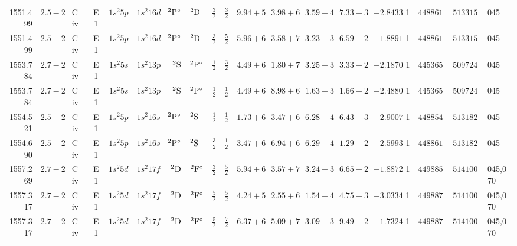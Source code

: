 \begin{table*}
\begin{tabular}{rrlcr@{ -- }lr@{ -- }lr@{ -- }lllllrrr@{ -- }rl}
   1551.499\phantom{0000000} & $2.5-2$ & C\,{\sc iv} & E1 &  $1s^{2}5p$ & $1s^{2}16d$ & $^{2}{\rm P}^\circ$ & $^{2}{\rm D}$       &  $\frac{3}{2}$ & $\frac{3}{2}$  & $9.94+5$ & $3.98+6$ & $3.59-4$ & $7.33-3$ & $ -2.8433$ &     1 & $448861.20$ & $513315.00$ & 045 \\
   1551.499\phantom{0000000} & $2.5-2$ & C\,{\sc iv} & E1 &  $1s^{2}5p$ & $1s^{2}16d$ & $^{2}{\rm P}^\circ$ & $^{2}{\rm D}$       &  $\frac{3}{2}$ & $\frac{5}{2}$  & $5.96+6$ & $3.58+7$ & $3.23-3$ & $6.59-2$ & $ -1.8891$ &     1 & $448861.20$ & $513315.00$ & 045 \\
   1553.784\phantom{0000000} & $2.7-2$ & C\,{\sc iv} & E1 &  $1s^{2}5s$ & $1s^{2}13p$ &       $^{2}{\rm S}$ & $^{2}{\rm P}^\circ$ &  $\frac{1}{2}$ & $\frac{3}{2}$  & $4.49+6$ & $1.80+7$ & $3.25-3$ & $3.33-2$ & $ -2.1870$ &     1 & $445365.70$ & $509724.70$ & 045 \\
   1553.784\phantom{0000000} & $2.7-2$ & C\,{\sc iv} & E1 &  $1s^{2}5s$ & $1s^{2}13p$ &       $^{2}{\rm S}$ & $^{2}{\rm P}^\circ$ &  $\frac{1}{2}$ & $\frac{1}{2}$  & $4.49+6$ & $8.98+6$ & $1.63-3$ & $1.66-2$ & $ -2.4880$ &     1 & $445365.70$ & $509724.70$ & 045 \\
   1554.521\phantom{0000000} & $2.5-2$ & C\,{\sc iv} & E1 &  $1s^{2}5p$ & $1s^{2}16s$ & $^{2}{\rm P}^\circ$ & $^{2}{\rm S}$       &  $\frac{1}{2}$ & $\frac{1}{2}$  & $1.73+6$ & $3.47+6$ & $6.28-4$ & $6.43-3$ & $ -2.9007$ &     1 & $448854.20$ & $513182.70$ & 045 \\
   1554.690\phantom{0000000} & $2.5-2$ & C\,{\sc iv} & E1 &  $1s^{2}5p$ & $1s^{2}16s$ & $^{2}{\rm P}^\circ$ & $^{2}{\rm S}$       &  $\frac{3}{2}$ & $\frac{1}{2}$  & $3.47+6$ & $6.94+6$ & $6.29-4$ & $1.29-2$ & $ -2.5993$ &     1 & $448861.20$ & $513182.70$ & 045 \\
   1557.269\phantom{0000000} & $2.7-2$ & C\,{\sc iv} & E1 &  $1s^{2}5d$ & $1s^{2}17f$ &       $^{2}{\rm D}$ & $^{2}{\rm F}^\circ$ &  $\frac{3}{2}$ & $\frac{5}{2}$  & $5.94+6$ & $3.57+7$ & $3.24-3$ & $6.65-2$ & $ -1.8872$ &     1 & $449885.50$ & $514100.50$ & 045,070 \\
   1557.317\phantom{0000000} & $2.7-2$ & C\,{\sc iv} & E1 &  $1s^{2}5d$ & $1s^{2}17f$ &       $^{2}{\rm D}$ & $^{2}{\rm F}^\circ$ &  $\frac{5}{2}$ & $\frac{5}{2}$  & $4.24+5$ & $2.55+6$ & $1.54-4$ & $4.75-3$ & $ -3.0334$ &     1 & $449887.50$ & $514100.50$ & 045,070 \\
   1557.317\phantom{0000000} & $2.7-2$ & C\,{\sc iv} & E1 &  $1s^{2}5d$ & $1s^{2}17f$ &       $^{2}{\rm D}$ & $^{2}{\rm F}^\circ$ &  $\frac{5}{2}$ & $\frac{7}{2}$  & $6.37+6$ & $5.09+7$ & $3.09-3$ & $9.49-2$ & $ -1.7324$ &     1 & $449887.50$ & $514100.50$ & 045,070 \\

\end{tabular}
\end{table*}
